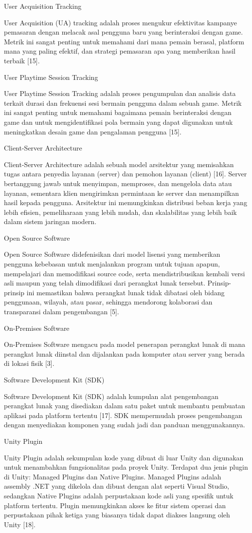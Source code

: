 User Acquisition Tracking

User Acquisition (UA) tracking adalah proses mengukur efektivitas kampanye pemasaran dengan melacak asal pengguna baru yang berinteraksi dengan game. Metrik ini sangat penting untuk memahami dari mana pemain berasal, platform mana yang paling efektif, dan strategi pemasaran apa yang memberikan hasil terbaik [15].

User Playtime Session Tracking

User Playtime Session Tracking adalah proses pengumpulan dan analisis data terkait durasi dan frekuensi sesi bermain pengguna dalam sebuah game. Metrik ini sangat penting untuk memahami bagaimana pemain berinteraksi dengan game dan untuk mengidentifikasi pola bermain yang dapat digunakan untuk meningkatkan desain game dan pengalaman pengguna [15].

Client-Server Architecture

Client-Server Architecture adalah sebuah model arsitektur yang memisahkan tugas antara penyedia layanan (server) dan pemohon layanan (client)​ ​[16]. Server bertanggung jawab untuk menyimpan, memproses, dan mengelola data atau layanan, sementara klien mengirimkan permintaan ke server dan menampilkan hasil kepada pengguna. Arsitektur ini memungkinkan distribusi beban kerja yang lebih efisien, pemeliharaan yang lebih mudah, dan skalabilitas yang lebih baik dalam sistem jaringan modern.

Open Source Software

Open Source Software didefenisikan dari model lisensi yang memberikan pengguna kebebasan untuk menjalankan program untuk tujuan apapun, mempelajari dan memodifikasi source code, serta mendistribusikan kembali versi asli maupun yang telah dimodifikasi dari perangkat lunak tersebut. Prinsip-prinsip ini memastikan bahwa perangkat lunak tidak dibatasi oleh bidang penggunaan, wilayah, atau pasar, sehingga mendorong kolaborasi dan transparansi dalam pengembangan [5].

On-Premises Software

On-Premises Software mengacu pada model penerapan perangkat lunak di mana perangkat lunak diinstal dan dijalankan pada komputer atau server yang berada di lokasi fisik [3].

Software Development Kit (SDK)

Software Development Kit (SDK) adalah kumpulan alat pengembangan perangkat lunak yang disediakan dalam satu paket untuk membantu pembuatan aplikasi pada platform tertentu [17]. SDK mempermudah proses pengembangan dengan menyediakan komponen yang sudah jadi dan panduan menggunakannya.

Unity Plugin

Unity Plugin adalah sekumpulan kode yang dibuat di luar Unity dan digunakan untuk menambahkan fungsionalitas pada proyek Unity. Terdapat dua jenis plugin di Unity: Managed Plugins dan Native Plugins. Managed Plugins adalah assembly .NET yang dikelola dan dibuat dengan alat seperti Visual Studio, sedangkan Native Plugins adalah perpustakaan kode asli yang spesifik untuk platform tertentu. Plugin memungkinkan akses ke fitur sistem operasi dan perpustakaan pihak ketiga yang biasanya tidak dapat diakses langsung oleh Unity​ [18].

